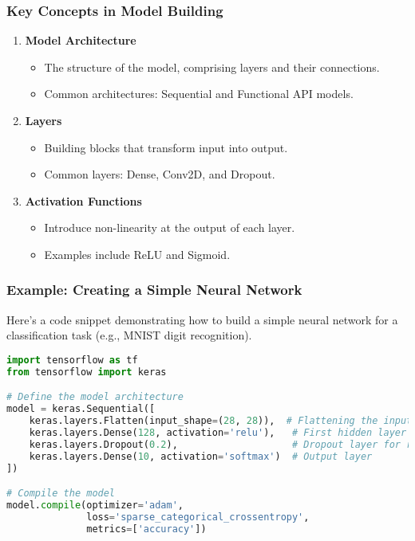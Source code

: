 \documentclass[aspectratio=169]{beamer}
\begin{document}
\begin{frame}
    \frametitle{Key Concepts in Model Building}
    \begin{enumerate}
        \item \textbf{Model Architecture}
        \begin{itemize}
            \item The structure of the model, comprising layers and their connections.
            \item Common architectures: Sequential and Functional API models.
        \end{itemize}

        \item \textbf{Layers}
        \begin{itemize}
            \item Building blocks that transform input into output.
            \item Common layers: Dense, Conv2D, and Dropout.
        \end{itemize}

        \item \textbf{Activation Functions}
        \begin{itemize}
            \item Introduce non-linearity at the output of each layer.
            \item Examples include ReLU and Sigmoid.
        \end{itemize}
    \end{enumerate}
\end{frame}

\begin{frame}[fragile]
    \frametitle{Example: Creating a Simple Neural Network}
    Here's a code snippet demonstrating how to build a simple neural network for a classification task (e.g., MNIST digit recognition).

    \begin{lstlisting}[language=Python]
import tensorflow as tf
from tensorflow import keras

# Define the model architecture
model = keras.Sequential([
    keras.layers.Flatten(input_shape=(28, 28)),  # Flattening the input
    keras.layers.Dense(128, activation='relu'),   # First hidden layer
    keras.layers.Dropout(0.2),                    # Dropout layer for regularization
    keras.layers.Dense(10, activation='softmax')  # Output layer
])

# Compile the model
model.compile(optimizer='adam',       
              loss='sparse_categorical_crossentropy',  
              metrics=['accuracy'])   
    \end{lstlisting}
\end{frame}
\end{document}
